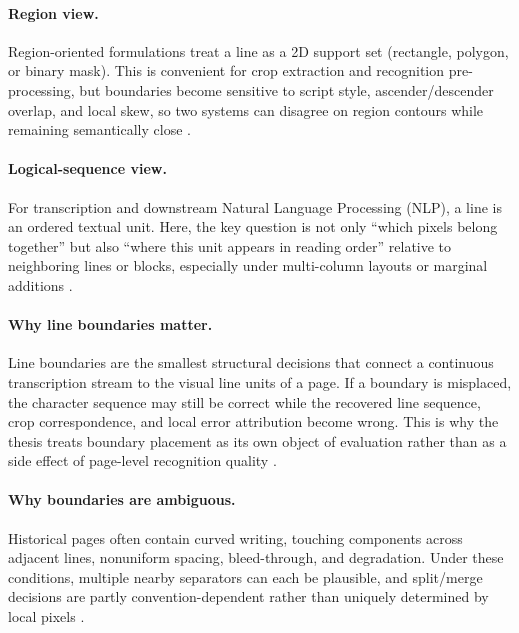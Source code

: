 \paragraph{Region view.}
Region-oriented formulations treat a line as a 2D support set (rectangle, polygon, or binary mask). This is convenient for crop extraction and recognition pre-processing, but boundaries become sensitive to script style, ascender/descender overlap, and local skew, so two systems can disagree on region contours while remaining semantically close .

\paragraph{Logical-sequence view.}
For transcription and downstream Natural Language Processing (NLP), a line is an ordered textual unit. Here, the key question is not only ``which pixels belong together'' but also ``where this unit appears in reading order'' relative to neighboring lines or blocks, especially under multi-column layouts or marginal additions .

\paragraph{Why line boundaries matter.}
Line boundaries are the smallest structural decisions that connect a continuous transcription stream to the visual line units of a page. If a boundary is misplaced, the character sequence may still be correct while the recovered line sequence, crop correspondence, and local error attribution become wrong. This is why the thesis treats boundary placement as its own object of evaluation rather than as a side effect of page-level recognition quality .

\paragraph{Why boundaries are ambiguous.}
Historical pages often contain curved writing, touching components across adjacent lines, nonuniform spacing, bleed-through, and degradation. Under these conditions, multiple nearby separators can each be plausible, and split/merge decisions are partly convention-dependent rather than uniquely determined by local pixels .


